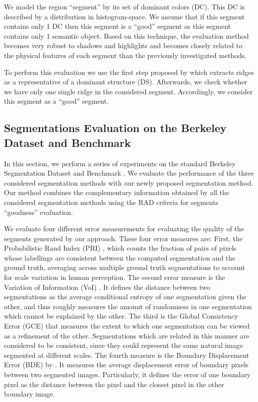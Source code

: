 \documentclass[10pt,twocolumn,letterpaper]{article}
\begin{document}
We model the region ``segment'' by its set of dominant colors (DC). This DC is described
by a distribution in histogram-space. We assume that if this segment contains only 1 DC
then this segment is a ``good'' segment as this segment contains only 1 semantic object.
Based on this technique, the evaluation method becomes very robust to shadows and highlights
and becomes closely related to the physical features of each segment than the previously
investigated methods.

To perform this evaluation we use the first step proposed by \cite{1478239} which extracts ridges as a representative
of a dominant structure (DS). Afterwards, we check whether we have only one single
ridge in the considered segment. Accordingly, we consider this segment as a ``good'' segment.

\subsection{Segmentations Evaluation on the Berkeley Dataset and Benchmark}

In this section, we perform a series of experiments on the standard Berkeley Segmentation Dataset and
Benchmark \cite{MartinFTM01}. We evaluate the performance of the three considered segmentation methods with our
newly proposed segmentation method. Our method combines the complementary information obtained by all the
considered segmentation methods using the RAD criteria for segments ``goodness'' evaluation.

We evaluate four different error measurements for evaluating the quality of the segments
generated by our approach. These four error measures are: First, the Probabilistic Rand Index
(PRI) \cite{Unnikrishnan_2007_5789}, which counts the fraction of pairs of pixels whose labellings are
consistent between the computed segmentation and the ground truth, averaging across
multiple ground truth segmentations to account for scale variation in human perception.
The second error measure is the Variation of Information (VoI) \cite{citeulike:3906686}.
It defines the distance between two segmentations as the average conditional entropy
of one segmentation given the other, and thus roughly measures the amount of randomness
in one segmentation which cannot be explained by the other. The third is the Global
Consistency Error (GCE) \cite{MartinFTM01} that measures the extent to which one
segmentation can be viewed as a refinement of the other. Segmentations which are related
in this manner are considered to be consistent, since they could represent the same
natural image segmented at different scales. The fourth measure is the Boundary
Displacement Error (BDE) by \cite{649319}. It measures the average displacement error of
boundary pixels between two segmented images. Particularly, it defines the error of one
boundary pixel as the distance between the pixel and the closest pixel in the other
boundary image.
\end{document}
